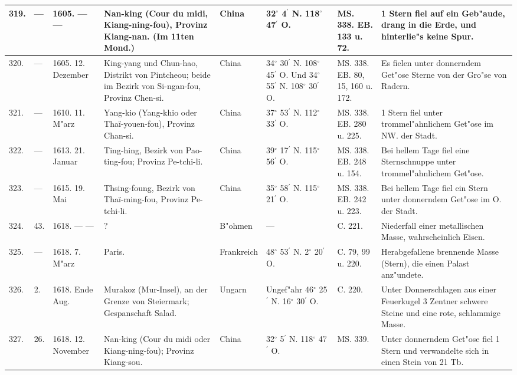 \documentclass[a4paper, 8pt, oneside, polutonikogreek, german]{article}
\begin{document}
\begin{center}
\begin{longtable}{| p{5mm} | p{3mm} | p{15mm} | p{25mm} | p{20mm} | p{14mm} | p{17mm} | p{24mm} |}
        319. & --- & 1605. --- --- & Nan-king (Cour du midi, Kiang-ning-fou), Provinz Kiang-nan. (Im 11ten Mond.) & China & 32$^\circ$ 4$^\prime$ N. 118$^\circ$ 47$^\prime$ O. & MS. 338. EB. 133 u. 72. & 1 Stern fiel auf ein Geb"aude, drang in die Erde, und hinterlie"s keine Spur. \\ \hline
        320. & --- & 1605. 12. Dezember & King-yang und Chun-hao, Distrikt von Pintcheou; beide im Bezirk von Si-ngan-fou, Provinz Chen-si. & China & 34$^\circ$ 30$^\prime$ N. 108$^\circ$ 45$^\prime$ O. Und 34$^\circ$ 55$^\prime$ N. 108$^\circ$ 30$^\prime$ O. & MS. 338. EB. 80, 15, 160 u. 172. & Es fielen unter donnerndem Get"ose Sterne von der Gro"se von Radern. \\ \hline
        321. & --- & 1610. 11. M"arz & Yang-kio (Yang-khio oder Thaï-youen-fou), Provinz Chan-si. & China & 37$^\circ$ 53$^\prime$ N. 112$^\circ$ 33$^\prime$ O. & MS. 338. EB. 280 u. 225. & 1 Stern fiel unter trommel"ahnlichem Get"ose im NW. der Stadt. \\ \hline
        322. & --- & 1613. 21. Januar & Ting-hing, Bezirk von Pao-ting-fou; Provinz Pe-tchi-li. & China & 39$^\circ$ 17$^\prime$ N. 115$^\circ$ 56$^\prime$ O. & MS. 338. EB. 248 u. 154. & Bei hellem Tage fiel eine Sternschnuppe unter trommel"ahnlichem Get"ose. \\ \hline
        323. & --- & 1615. 19. Mai & Thsing-foung, Bezirk von Thaï-ming-fou, Provinz Pe-tchi-li. & China & 35$^\circ$ 58$^\prime$ N. 115$^\circ$ 21$^\prime$ O. & MS. 338. EB. 242 u. 223. & Bei hellem Tage fiel ein Stern unter donnerndem Get"ose im O. der Stadt. \\ \hline
        324. & 43. & 1618. --- --- & ? & B"ohmen & --- & C. 221. & Niederfall einer metallischen Masse, wahrscheinlich Eisen. \\ \hline
        325. & --- & 1618. 7. M"arz & Paris. & Frankreich & 48$^\circ$ 53$^\prime$ N. 2$^\circ$ 20$^\prime$ O. & C. 79, 99 u. 220. & Herabgefallene brennende Masse (Stern), die einen Palast anz"undete. \\ \hline
        326. & 2. & 1618. Ende Aug. & Murakoz (Mur-Insel), an der Grenze von Steiermark; Gespanschaft Salad. & Ungarn & Ungef"ahr 46$^\circ$ 25$^\prime$ N. 16$^\circ$ 30$^\prime$ O. & C. 220. & Unter Donnerschlagen aus einer Feuerkugel 3 Zentner schwere Steine und eine rote, schlammige Masse. \\ \hline
        327. & 26. & 1618. 12. November & Nan-king (Cour du midi oder Kiang-ning-fou); Provinz Kiang-sou. & China & 32$^\circ$ 5$^\prime$ N. 118$^\circ$ 47$^\prime$ O. & MS. 339. & Unter donnerndem Get"ose fiel 1 Stern und verwandelte sich in einen Stein von 21 Tb. \\ \hline

\end{longtable}
\end{center}
\end{document}
